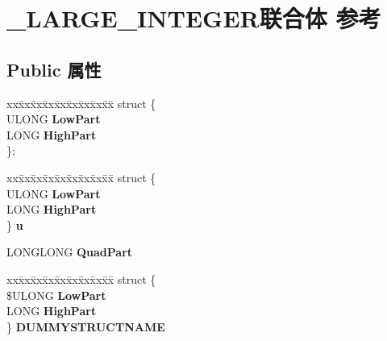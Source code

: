 \hypertarget{union___l_a_r_g_e___i_n_t_e_g_e_r}{}\section{\+\_\+\+L\+A\+R\+G\+E\+\_\+\+I\+N\+T\+E\+G\+E\+R联合体 参考}
\label{union___l_a_r_g_e___i_n_t_e_g_e_r}
\subsection*{Public 属性}
\begin{DoxyCompactItemize}
\item 
\mbox{\label{union___l_a_r_g_e___i_n_t_e_g_e_r_ab62e82a6a934d726a935ec99815a6085}} 
\begin{tabbing}
xx\=xx\=xx\=xx\=xx\=xx\=xx\=xx\=xx\=\kill
struct \{\\
\>ULONG {\bfseries LowPart}\\
\>LONG {\bfseries HighPart}\\
\}; \\

\end{tabbing}\item 
\mbox{\label{union___l_a_r_g_e___i_n_t_e_g_e_r_aec3f3bd1d6dba1d7e76ac27d7b1630a6}} 
\begin{tabbing}
xx\=xx\=xx\=xx\=xx\=xx\=xx\=xx\=xx\=\kill
struct \{\\
\>ULONG {\bfseries LowPart}\\
\>LONG {\bfseries HighPart}\\
\} {\bfseries u}\\

\end{tabbing}\item 
\mbox{\label{union___l_a_r_g_e___i_n_t_e_g_e_r_a34beb9c05c3a2982d57fc450cc934ae3}} 
L\+O\+N\+G\+L\+O\+NG {\bfseries Quad\+Part}
\item 
\mbox{\label{union___l_a_r_g_e___i_n_t_e_g_e_r_aee37e7a2ba938dbc096e714bdb8d2d6b}} 
\begin{tabbing}
xx\=xx\=xx\=xx\=xx\=xx\=xx\=xx\=xx\=\kill
struct \{\\
\>\$ULONG {\bfseries LowPart}\\
\>LONG {\bfseries HighPart}\\
\} {\bfseries DUMMYSTRUCTNAME}\\


\end{tabbing}
\end{DoxyCompactItemize}
